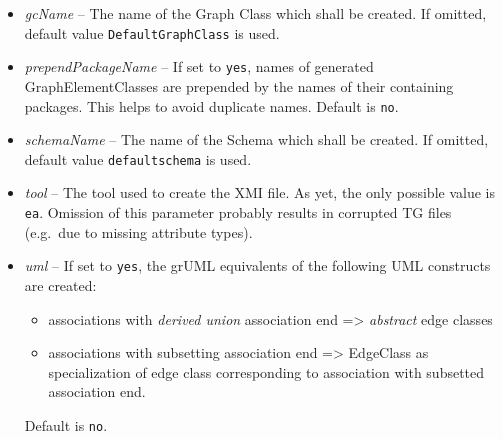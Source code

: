 \documentclass[a4paper]{article}
\begin{document}
\begin{itemize}
		\item \emph{gcName} -- The name of the Graph Class which shall be created. If omitted, default value  \texttt{Default\-GraphClass} is used.
		\item \emph{prependPackageName} --  If set to \texttt{yes}, names of generated GraphElementClasses are prepended by the names of their containing packages. This helps to avoid duplicate names. Default is \texttt{no}.
		\item \emph{schemaName} -- The name of the Schema which shall be created. If omitted, default value \texttt{default\-schema} is used.
		\item \emph{tool} -- The tool used to create the XMI file. As yet, the only possible value is \texttt{ea}. Omission of this parameter probably results in corrupted TG files (e.g.\ due to missing attribute types).
		\item \emph{uml} -- If set to \texttt{yes}, the grUML equivalents of the following UML constructs are created:
		\begin{itemize}
			\item associations with \emph{derived union} association end => \emph{abstract} edge classes
			\item associations with subsetting association end => EdgeClass as specialization of edge class corresponding to association with subsetted association end.
		\end{itemize}
		Default is \texttt{no}.
	\end{itemize}

	
\end{document}
